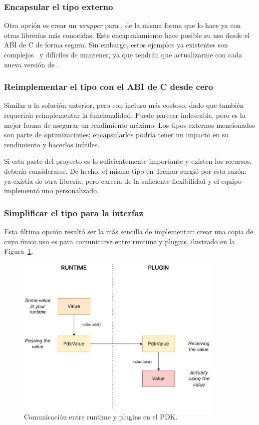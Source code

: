 \subsubsection{Encapsular el tipo externo}

Otra opción es crear un \emph{wrapper} para , de la misma forma
que lo hace ya \abistable con otras librerías más conocidas. Este
encapsulamiento hace posible su uso desde el ABI de C de forma segura. Sin
embargo, estos ejemplos ya existentes son complejos~\cite{complexwrapper} y
difíciles de mantener, ya que tendrán que actualizarme con cada nueva versión de
.

\subsubsection{Reimplementar el tipo con el ABI de C desde cero}

Similar a la solución anterior, pero con incluso más costoso, dado que también
requeriría reimplementar la funcionalidad. Puede parecer indeseable, pero es la
mejor forma de asegurar un rendimiento máximo. Los tipos externos mencionados
son parte de optimizaciones; encapsularlos podría tener un impacto en su
rendimiento y hacerlos inútiles.

Si esta parte del proyecto es lo suficientemente importante y existen los
recursos, debería considerarse. De hecho, el mismo tipo  en Tremor
surgió por esta razón: ya existía  de otra librería, pero
carecía de la suficiente flexibilidad y el equipo implementó uno personalizado.

\subsubsection{Simplificar el tipo para la interfaz}

Esta última opción resultó ser la más sencilla de implementar: crear una copia
de  cuyo único uso es para comunicarse entre runtime y plugins,
ilustrado en la Figura~\ref{fig:simplify}.

\begin{figure}
    \centering
    \includegraphics[width=10cm]{./Imagenes/simplify.pdf}
    \caption{Comunicación entre runtime y plugins en el PDK.}%
    \label{fig:simplify}
\end{figure}

